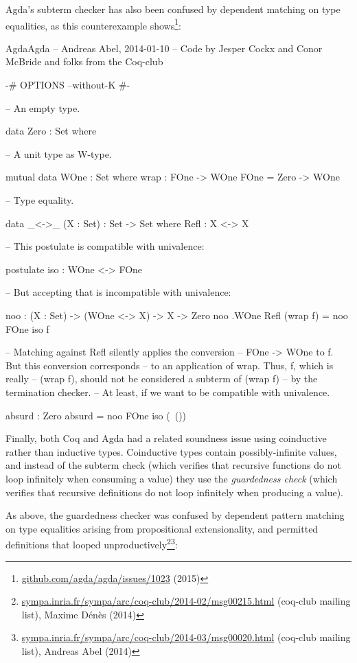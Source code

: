\documentclass[11pt,oneside]{article}
\newenvironment{codegroup}
  {\par\addvspace{\medskipamount}%
   \tcbset{cebox/.append style={before skip=7pt, after skip=7pt}}}
  {\par\addvspace{\medskipamount}}
\begin{document}
Agda's subterm checker has also been confused by dependent matching on type equalities, as this counterexample shows\footnote{\href{https://github.com/agda/agda/issues/1023/}{github.com/\allowbreak{}agda/\allowbreak{}agda/\allowbreak{}issues/\allowbreak{}1023} (2015)}:

\begin{codegroup}
\begin{codebox}{Agda}{Agda}
-- Andreas Abel, 2014-01-10
-- Code by Jesper Cockx and Conor McBride and folks from the Coq-club

{-# OPTIONS --without-K #-}

-- An empty type.

data Zero : Set where

-- A unit type as W-type.

mutual
  data WOne : Set where wrap : FOne -> WOne
  FOne = Zero -> WOne

-- Type equality.

data _<->_ (X : Set) : Set -> Set where
  Refl : X <-> X

-- This postulate is compatible with univalence:

postulate
  iso : WOne <-> FOne

-- But accepting that is incompatible with univalence:

noo : (X : Set) -> (WOne <-> X) -> X -> Zero
noo .WOne Refl (wrap f) = noo FOne iso f

-- Matching against Refl silently applies the conversion
-- FOne -> WOne to f.  But this conversion corresponds
-- to an application of wrap.  Thus, f, which is really
-- (wrap f), should not be considered a subterm of (wrap f)
-- by the termination checker.
-- At least, if we want to be compatible with univalence.

absurd : Zero
absurd = noo FOne iso (\ ())
\end{codebox}
\end{codegroup}
Finally, both Coq and Agda had a related soundness issue using coinductive rather than inductive types. Coinductive types contain possibly-infinite values, and instead of the subterm check (which verifies that recursive functions do not loop infinitely when consuming a value) they use the \emph{guardedness check} (which verifies that recursive definitions do not loop infinitely when producing a value).

As above, the guardedness checker was confused by dependent pattern matching on type equalities arising from propositional extensionality, and permitted definitions that looped unproductively\footnote{\href{https://sympa.inria.fr/sympa/arc/coq-club/2014-02/msg00215.html}{sympa.inria.fr/\allowbreak{}sympa/\allowbreak{}arc/\allowbreak{}coq-club/\allowbreak{}2014-02/\allowbreak{}msg00215.html} (coq-club mailing list), Maxime Dénès (2014)}\footnote{\href{https://sympa.inria.fr/sympa/arc/coq-club/2014-03/msg00020.html}{sympa.inria.fr/\allowbreak{}sympa/\allowbreak{}arc/\allowbreak{}coq-club/\allowbreak{}2014-03/\allowbreak{}msg00020.html} (coq-club mailing list), Andreas Abel (2014)}:
\end{document}
